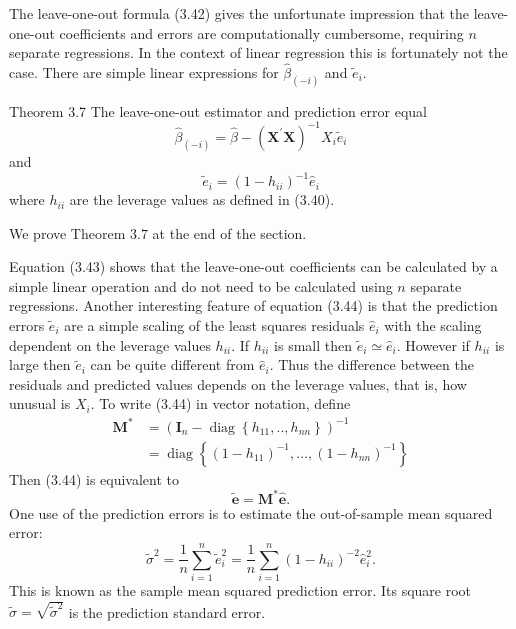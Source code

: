 \documentclass[10pt]{article}
\begin{document}
The leave-one-out formula (3.42) gives the unfortunate impression that the leave-one-out coefficients and errors are computationally cumbersome, requiring $n$ separate regressions. In the context of linear regression this is fortunately not the case. There are simple linear expressions for $\widehat{\beta}_{(-i)}$ and $\widetilde{e}_{i}$.

Theorem 3.7 The leave-one-out estimator and prediction error equal
$$
\widehat{\beta}_{(-i)}=\widehat{\beta}-\left(\boldsymbol{X}^{\prime} \boldsymbol{X}\right)^{-1} X_{i} \widetilde{e}_{i}
$$
and
$$
\widetilde{e}_{i}=\left(1-h_{i i}\right)^{-1} \widehat{e}_{i}
$$
where $h_{i i}$ are the leverage values as defined in (3.40).

We prove Theorem $3.7$ at the end of the section.

Equation (3.43) shows that the leave-one-out coefficients can be calculated by a simple linear operation and do not need to be calculated using $n$ separate regressions. Another interesting feature of equation (3.44) is that the prediction errors $\widetilde{e}_{i}$ are a simple scaling of the least squares residuals $\widehat{e}_{i}$ with the scaling dependent on the leverage values $h_{i i}$. If $h_{i i}$ is small then $\widetilde{e}_{i} \simeq \widehat{e}_{i}$. However if $h_{i i}$ is large then $\widetilde{e}_{i}$ can be quite different from $\widehat{e}_{i}$. Thus the difference between the residuals and predicted values depends on the leverage values, that is, how unusual is $X_{i}$. To write (3.44) in vector notation, define
$$
\begin{aligned}
\boldsymbol{M}^{*} &=\left(\boldsymbol{I}_{n}-\operatorname{diag}\left\{h_{11}, . ., h_{n n}\right\}\right)^{-1} \\
&=\operatorname{diag}\left\{\left(1-h_{11}\right)^{-1}, \ldots,\left(1-h_{n n}\right)^{-1}\right\}
\end{aligned}
$$
Then (3.44) is equivalent to
$$
\widetilde{\boldsymbol{e}}=\boldsymbol{M}^{*} \widehat{\boldsymbol{e}} .
$$
One use of the prediction errors is to estimate the out-of-sample mean squared error:
$$
\widetilde{\sigma}^{2}=\frac{1}{n} \sum_{i=1}^{n} \widetilde{e}_{i}^{2}=\frac{1}{n} \sum_{i=1}^{n}\left(1-h_{i i}\right)^{-2} \widehat{e}_{i}^{2} .
$$
This is known as the sample mean squared prediction error. Its square root $\widetilde{\sigma}=\sqrt{\widetilde{\sigma}^{2}}$ is the prediction standard error.
\end{document}
